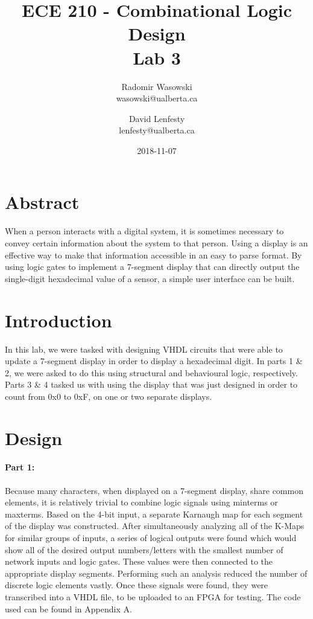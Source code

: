 \documentclass{article}
\title{ECE 210 - Combinational Logic Design \\ Lab 3}
\date{2018-11-07}
\author{Radomir Wasowski \\ wasowski@ualberta.ca
        \and David Lenfesty \\ lenfesty@ualberta.ca}
\begin{document}
\doublespacing
\maketitle
\newpage

\singlespacing

\section{Abstract}

When a person interacts with a digital system, it is sometimes necessary to convey certain information about the system to that person. Using a display is an effective way to make that information accessible in an easy to parse format.
By using logic gates to implement a 7-segment display that can directly output the single-digit hexadecimal value of a sensor,
a simple user interface can be built.

\section{Introduction}

In this lab, we were tasked with designing VHDL circuits that were able to update a 7-segment display
in order to display a hexadecimal digit.
In parts 1 \& 2, we were asked to do this using structural and behavioural logic, respectively.
Parts 3 \& 4 tasked us with using the display that was just designed in order to count from 0x0 to 0xF, on one or two separate displays.

\section{Design}

\paragraph{Part 1:}

Because many characters, when displayed on a 7-segment display, share common elements,
it is relatively trivial to combine logic signals using minterms or maxterms.
Based on the 4-bit input, a separate Karnaugh map for each segment of the display was constructed. After simultaneously analyzing all of the K-Maps for similar groups of inputs, a series of logical outputs
were found which would show all of the  desired output numbers/letters with the smallest number of network inputs and logic gates. These values were then connected to the appropriate display segments.
Performing such an analysis reduced the number of discrete logic elements vastly.
Once these signals were found, they were transcribed into a VHDL file,
to be uploaded to an FPGA for testing. The code used can be found in Appendix A.
\end{document}
